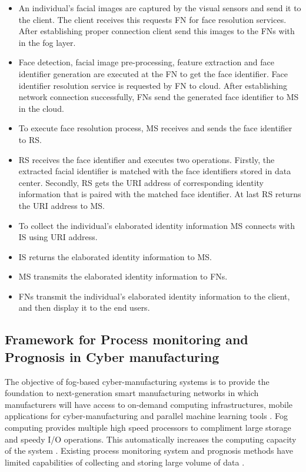 \documentclass[10pt,a4paper,journal]{IEEEtran}
\begin{document}
\begin{itemize}

\item An individual's facial images are captured by the visual sensors and send it to the client. The client receives this requests FN for face resolution services. After establishing proper connection client send this images to the FNs with in the fog layer.

\item Face detection, facial image pre-processing, feature extraction and face identifier generation are executed at the FN to get the face identifier. Face identifier resolution service is requested by FN to cloud. After establishing network connection successfully, FNs send the generated face identifier to MS in the cloud.

\item To execute face resolution process, MS receives and sends the face identifier to RS.

\item RS receives the face identifier and executes two operations. Firstly, the extracted facial identifier is matched with the face identifiers stored in data center. Secondly, RS gets the URI address of corresponding identity information that is paired with the matched face identifier. At last RS returns the URI address to MS.

\item To collect the individual's elaborated identity information MS connects with IS using URI address.

\item IS returns the elaborated identity information to MS.

\item MS transmits the elaborated identity information to FNs.

\item FNs transmit the individual's elaborated identity information to the client, and then display it to the end users.

\end{itemize}

\subsection{Framework for Process monitoring and Prognosis in Cyber manufacturing}
\hspace*{1em}	The objective of fog-based cyber-manufacturing systems is to provide the foundation to next-generation smart manufacturing networks in which manufacturers will have access to on-demand computing infrastructures, mobile applications for cyber-manufacturing and parallel machine learning tools \cite{9}. Fog computing provides multiple high speed processors to compliment large storage and speedy I/O operations. This automatically increases the computing capacity of the system \cite{10}. Existing process monitoring system and prognosis methods have limited capabilities of collecting and storing large volume of data \cite{11}. 
\end{document}
